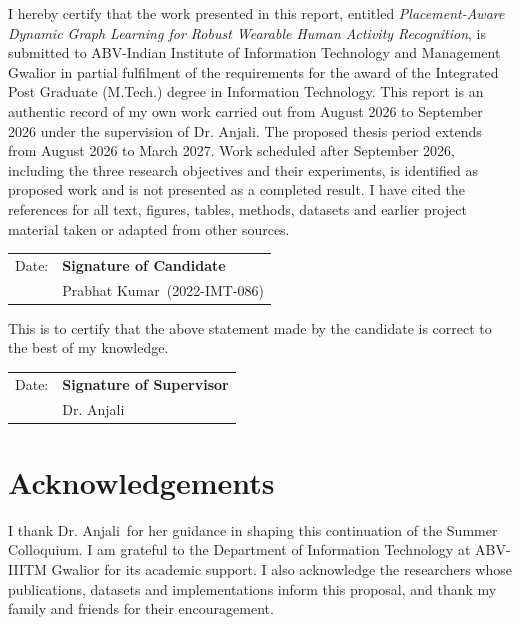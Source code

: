\documentclass[10pt,a4paper,oneside,openany]{report}
\newcommand{\projecttitle}{Placement-Aware Dynamic Graph Learning for Robust Wearable Human Activity Recognition}
\newcommand{\studentname}{Prabhat Kumar}
\newcommand{\rollnumber}{2022-IMT-086}
\newcommand{\supervisorname}{Dr. Anjali}
\begin{document}
I hereby certify that the work presented in this report, entitled \emph{\projecttitle}, is submitted to ABV-Indian Institute of Information Technology and Management Gwalior in partial fulfilment of the requirements for the award of the Integrated Post Graduate (M.Tech.) degree in Information Technology. This report is an authentic record of my own work carried out from August 2026 to September 2026 under the supervision of \supervisorname. The proposed thesis period extends from August 2026 to March 2027. Work scheduled after September 2026, including the three research objectives and their experiments, is identified as proposed work and is not presented as a completed result. I have cited the references for all text, figures, tables, methods, datasets and earlier project material taken or adapted from other sources.

\vspace{1cm}
\begin{center}
\begin{tabular}{p{}p{}}
Date: & \textbf{Signature of Candidate} \\[0.5cm]
& \studentname\ (\rollnumber)  \\
\end{tabular}
\end{center}
\vspace{1.4cm}
\noindent This is to certify that the above statement made by the candidate is correct to the best of my knowledge.
\vspace{1.2cm}
\begin{center}
\begin{tabular}{p{}p{}}
Date: & \textbf{Signature of Supervisor} \\[0.5cm]
& \supervisorname \\
\end{tabular}
\end{center}

\cleardoublepage
\chapter*{Acknowledgements}

I thank \supervisorname\ for her guidance in shaping this continuation of the Summer Colloquium. I am grateful to the Department of Information Technology at ABV-IIITM Gwalior for its academic support. I also acknowledge the researchers whose publications, datasets and implementations inform this proposal, and thank my family and friends for their encouragement.
\end{document}
